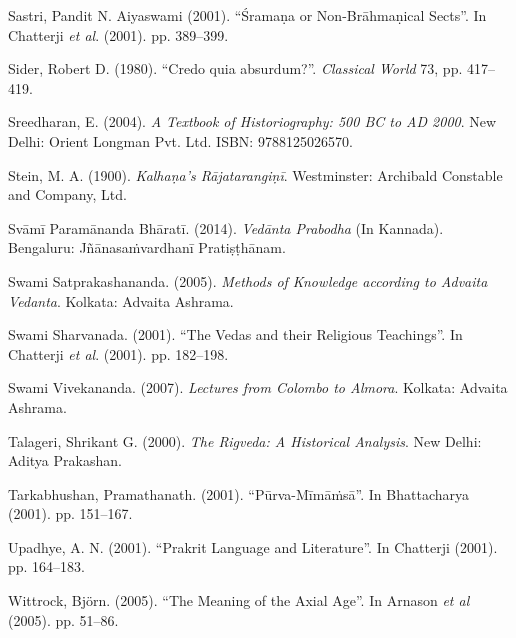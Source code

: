 \begin{thebibliography}{99}
  Sastri, Pandit N. Aiyaswami (2001). “Śramaṇa or Non-Brāhmaṇical Sects”. In Chatterji \textit{et al}. (2001). pp. 389–399.

  Sider, Robert D. (1980). “Credo quia absurdum?”. \textit{Classical World} 73, pp. 417–419.

  Sreedharan, E. (2004). \textit{A Textbook of Historiography: 500 BC to AD 2000}. New Delhi: Orient Longman Pvt. Ltd. ISBN: 9788125026570.

  Stein, M. A. (1900). \textit{Kalhaṇa’s Rājatarangiṇī}. Westminster: Archibald Constable and Company, Ltd.

  Svāmī Paramānanda Bhāratī. (2014). \textit{Vedānta Prabodha} (In Kannada). Bengaluru: Jñānasaṁvardhanī Pratiṣṭhānam.

  Swami Satprakashananda. (2005). \textit{Methods of Knowledge according to Advaita Vedanta}. Kolkata: Advaita Ashrama.

  Swami Sharvanada. (2001). “The Vedas and their Religious Teachings”. In Chatterji \textit{et al}. (2001). pp. 182–198.

  Swami Vivekananda. (2007). \textit{Lectures from Colombo to Almora}. Kolkata: Advaita Ashrama.

  Talageri, Shrikant G. (2000). \textit{The Rigveda: A Historical Analysis}. New Delhi: Aditya Prakashan.

  Tarkabhushan, Pramathanath. (2001). “Pūrva-Mīmāṁsā”. In Bhattacharya (2001). pp. 151–167.

  Upadhye, A. N. (2001). “Prakrit Language and Literature”. In Chatterji (2001). pp. 164–183.

  Wittrock, Björn. (2005). “The Meaning of the Axial Age”. In Arnason \textit{et al} (2005). pp. 51–86.

 \end{thebibliography}

\theendnotes

